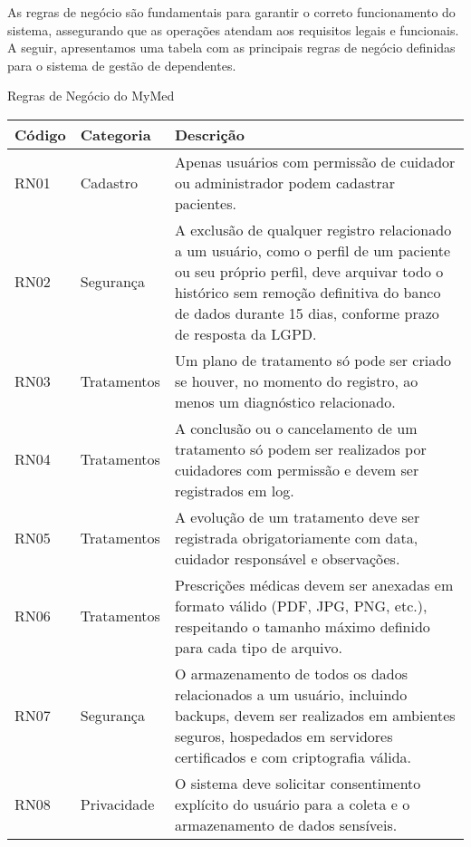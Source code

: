 As regras de negócio são fundamentais para garantir o correto funcionamento do sistema, assegurando que as operações atendam aos requisitos legais e funcionais. A seguir, apresentamos uma tabela com as principais regras de negócio definidas para o sistema de gestão de dependentes.
\renewcommand{\arraystretch}{1.5} %

\begin{quadro}
\caption{Regras de Negócio do MyMed}
\begin{tabularx}{\textwidth}{|l|l|X|}
\hline
\textbf{Código} & \textbf{Categoria} & \textbf{Descrição} \\ \hline
RN01 & Cadastro & Apenas usuários com permissão de cuidador ou administrador podem cadastrar pacientes. \\ \hline
RN02 & Segurança & A exclusão de qualquer registro relacionado a um usuário, como o perfil de um paciente ou seu próprio perfil, deve arquivar todo o histórico sem remoção definitiva do banco de dados durante 15 dias, conforme prazo de resposta da LGPD. \\ \hline
RN03 & Tratamentos & Um plano de tratamento só pode ser criado se houver, no momento do registro, ao menos um diagnóstico relacionado. \\ \hline
RN04 & Tratamentos & A conclusão ou o cancelamento de um tratamento só podem ser realizados por cuidadores com permissão e devem ser registrados em log. \\ \hline
RN05 & Tratamentos & A evolução de um tratamento deve ser registrada obrigatoriamente com data, cuidador responsável e observações. \\ \hline
RN06 & Tratamentos & Prescrições médicas devem ser anexadas em formato válido (PDF, JPG, PNG, etc.), respeitando o tamanho máximo definido para cada tipo de arquivo. \\ \hline
RN07 & Segurança & O armazenamento de todos os dados relacionados a um usuário, incluindo backups, devem ser realizados em ambientes seguros, hospedados em servidores certificados e com criptografia válida. \\ \hline
RN08 & Privacidade & O sistema deve solicitar consentimento explícito do usuário para a coleta e o armazenamento de dados sensíveis. \\ \hline
\end{tabularx}
\end{quadro}